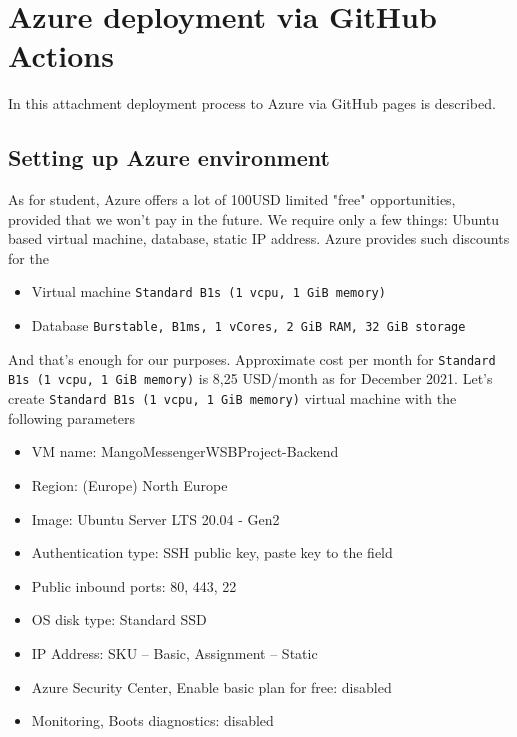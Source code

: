 \chapter{Azure deployment via GitHub Actions}\label{ch:azure-deloyment-via-github-actions}
In this attachment deployment process to Azure via GitHub pages is described.


\section{Setting up Azure environment}\label{sec:setting-up-azure-environment}
As for student, Azure offers a lot of 100USD limited "free" opportunities,
provided that we won't pay in the future.
We require only a few things: Ubuntu based virtual machine, database, static IP address.
Azure provides such discounts for the
\begin{itemize}
    \item Virtual machine \texttt{Standard B1s (1 vcpu, 1 GiB memory)}
    \item Database \texttt{Burstable, B1ms, 1 vCores, 2 GiB RAM, 32 GiB storage}
\end{itemize}
And that's enough for our purposes.
Approximate cost per month for \texttt{Standard B1s (1 vcpu, 1 GiB memory)} is 8,25 USD/month as for December 2021.
Let's create \texttt{Standard B1s (1 vcpu, 1 GiB memory)} virtual machine with the following parameters
\begin{itemize}
    \item VM name: MangoMessengerWSBProject-Backend
    \item Region: (Europe) North Europe
    \item Image: Ubuntu Server LTS 20.04 - Gen2
    \item Authentication type: SSH public key, paste key to the field
    \item Public inbound ports: 80, 443, 22
    \item OS disk type: Standard SSD
    \item IP Address: SKU -- Basic, Assignment -- Static
    \item Azure Security Center, Enable basic plan for free: disabled
    \item Monitoring, Boots diagnostics: disabled
\end{itemize}